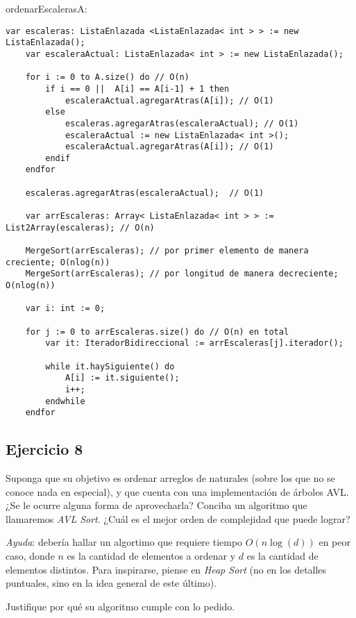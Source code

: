 \begin{proc}{ordenarEscaleras}{\Inout A: \Array{\Int}}{}
    \begin{lstlisting}[numbers=none,frame=none]
    var escaleras: ListaEnlazada <ListaEnlazada< int > > := new ListaEnlazada();
    var escaleraActual: ListaEnlazada< int > := new ListaEnlazada();

    for i := 0 to A.size() do // O(n)
        if i == 0 ||  A[i] == A[i-1] + 1 then
            escaleraActual.agregarAtras(A[i]); // O(1)
        else
            escaleras.agregarAtras(escaleraActual); // O(1)
            escaleraActual := new ListaEnlazada< int >();
            escaleraActual.agregarAtras(A[i]); // O(1)
        endif
    endfor

    escaleras.agregarAtras(escaleraActual);  // O(1)

    var arrEscaleras: Array< ListaEnlazada< int > > := List2Array(escaleras); // O(n)

    MergeSort(arrEscaleras); // por primer elemento de manera creciente; O(nlog(n))
    MergeSort(arrEscaleras); // por longitud de manera decreciente; O(nlog(n))

    var i: int := 0;

    for j := 0 to arrEscaleras.size() do // O(n) en total
        var it: IteradorBidireccional := arrEscaleras[j].iterador();

        while it.haySiguiente() do
            A[i] := it.siguiente();
            i++;
        endwhile
    endfor
    \end{lstlisting}
\end{proc}

\subsection{Ejercicio 8}
Suponga que su objetivo es ordenar arreglos de naturales (sobre los que no se conoce nada en especial), y que cuenta con una implementación de árboles AVL. ¿Se le ocurre alguna forma de aprovecharla? Conciba un algoritmo que llamaremos \textit{AVL Sort}. ¿Cuál es el mejor orden de complejidad que puede lograr?

\textit{Ayuda}: debería hallar un algortimo que requiere tiempo $O(n\log(d))$ en peor caso, donde $n$ es la cantidad de elementos a ordenar y $d$ es la cantidad de elementos distintos. Para inspirarse, piense en \textit{Heap Sort} (no en los detalles puntuales, sino en la idea general de este último).

Justifique por qué su algoritmo cumple con lo pedido.

